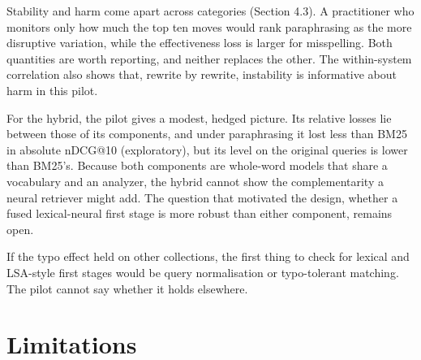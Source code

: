 \documentclass[
  11pt,
]{article}
\begin{document}
Stability and harm come apart across categories (Section 4.3). A
practitioner who monitors only how much the top ten moves would rank
paraphrasing as the more disruptive variation, while the effectiveness
loss is larger for misspelling. Both quantities are worth reporting, and
neither replaces the other. The within-system correlation also shows
that, rewrite by rewrite, instability is informative about harm in this
pilot.

For the hybrid, the pilot gives a modest, hedged picture. Its relative
losses lie between those of its components, and under paraphrasing it
lost less than BM25 in absolute nDCG@10 (exploratory), but its level on
the original queries is lower than BM25's. Because both components are
whole-word models that share a vocabulary and an analyzer, the hybrid
cannot show the complementarity a neural retriever might add. The
question that motivated the design, whether a fused lexical-neural first
stage is more robust than either component, remains open.

If the typo effect held on other collections, the first thing to check
for lexical and LSA-style first stages would be query normalisation or
typo-tolerant matching. The pilot cannot say whether it holds elsewhere.

\hypertarget{limitations}{%
\section{Limitations}\label{limitations}}
\end{document}
